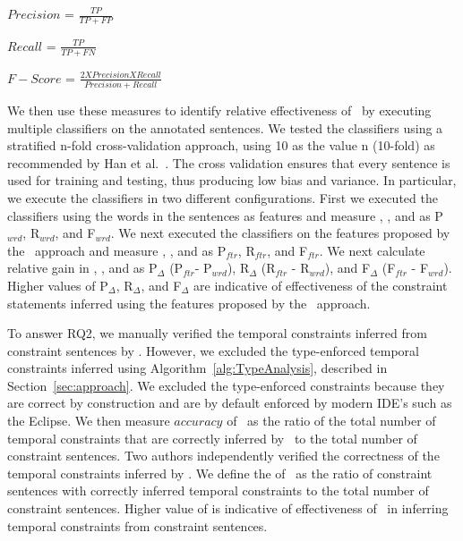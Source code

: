 \begin{center}

$Precision$ = $\frac{TP}{TP + FP}$

$Recall$ = $\frac{TP}{TP + FN}$

$F-Score$ = $\frac{2 X Precision X Recall}{Precision + Recall}$
\end{center}

We then use these measures to identify relative effectiveness of \tool\ by executing multiple classifiers on the annotated sentences.
We tested the classifiers using a stratified n-fold cross-validation approach,
using 10 as the value n (10-fold) as recommended by Han et al.~\cite{han2006data}.
The cross validation ensures that every sentence is used for training and testing,
thus producing low bias and variance.
In particular, we execute the classifiers in two different configurations.
First we executed the classifiers using the words in the sentences as features and measure , , and  as P$_{wrd}$, R$_{wrd}$, and F$_{wrd}$.
We next executed the classifiers on the features proposed by the \tool\ approach and measure , , and  as P$_{ftr}$, R$_{ftr}$, and F$_{ftr}$.
We next calculate relative gain in , , and  as P$_{\Delta}$ (P$_{ftr}$- P$_{wrd}$), R$_{\Delta}$ (R$_{ftr}$ - R$_{wrd}$), and F$_{\Delta}$ (F$_{ftr}$ - F$_{wrd}$). 
Higher values of P$_{\Delta}$, R$_{\Delta}$, and F$_{\Delta}$ are indicative of effectiveness of the constraint statements inferred using the features proposed by the \tool\ approach.


To answer RQ2, we manually verified the temporal constraints inferred from constraint sentences by \tool.
However, we excluded the type-enforced temporal constraints inferred using Algorithm~\ref{alg:TypeAnalysis}, described in Section~\ref{sec:approach}.
We excluded the type-enforced constraints because they are correct by construction and are by default enforced by modern IDE's such as the Eclipse. 
We then measure $accuracy$ of \tool\ as the ratio of the total number of temporal constraints that
are correctly inferred by \tool\ to the total number of constraint sentences. Two authors
independently verified the correctness of the temporal constraints inferred by \tool.
We define the  of \tool\ as the ratio of constraint sentences with correctly inferred temporal constraints
to the total number of constraint sentences. 
Higher value of  is indicative of effectiveness of \tool\ in inferring temporal constraints from constraint sentences.


